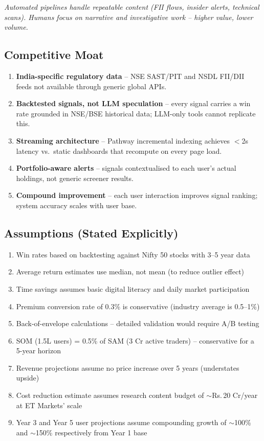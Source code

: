 \documentclass[11pt, a4paper]{article}
\newcommand{\Rs}{Rs.\,}
\begin{document}
\noindent
\small\textit{Automated pipelines handle repeatable content (FII flows, insider alerts, technical scans).
Humans focus on narrative and investigative work -- higher value, lower volume.}

\subsection{Competitive Moat}

\begin{enumerate}[leftmargin=1.8em, itemsep=3pt]
  \item \textbf{India-specific regulatory data} -- NSE SAST/PIT and NSDL FII/DII feeds
        not available through generic global APIs.
  \item \textbf{Backtested signals, not LLM speculation} -- every signal carries a win rate
        grounded in NSE/BSE historical data; LLM-only tools cannot replicate this.
  \item \textbf{Streaming architecture} -- Pathway incremental indexing achieves $<$2s
        latency vs.\ static dashboards that recompute on every page load.
  \item \textbf{Portfolio-aware alerts} -- signals contextualised to each user's
        actual holdings, not generic screener results.
  \item \textbf{Compound improvement} -- each user interaction improves signal ranking;
        system accuracy scales with user base.
\end{enumerate}

\subsection{Assumptions (Stated Explicitly)}

\begin{enumerate}[leftmargin=1.8em, itemsep=1pt]
  \item Win rates based on backtesting against Nifty 50 stocks with 3--5 year data
  \item Average return estimates use median, not mean (to reduce outlier effect)
  \item Time savings assumes basic digital literacy and daily market participation
  \item Premium conversion rate of 0.3\% is conservative (industry average is 0.5--1\%)
  \item Back-of-envelope calculations -- detailed validation would require A/B testing
  \item SOM (1.5L users) = 0.5\% of SAM (3 Cr active traders) -- conservative for a 5-year horizon
  \item Revenue projections assume no price increase over 5 years (understates upside)
  \item Cost reduction estimate assumes research content budget of $\sim$\Rs{}20 Cr/year at ET Markets' scale
  \item Year 3 and Year 5 user projections assume compounding growth of $\sim$100\% and $\sim$150\% respectively from Year 1 base
\end{enumerate}
\end{document}
